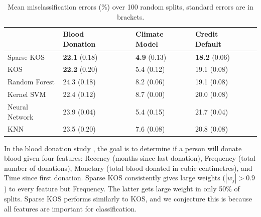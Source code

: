\documentclass[twoside, onecolumn]{article}
\begin{document}
\begin{table}[!t]
\begin{center}
    \begin{tabular}{|p{2.5cm} | p{1.7cm} |p{1.5cm} |p{1.7cm} | }
    \hline
    {}& {Blood $\quad$ Donation} & Climate Model & Credit$\quad$  Default\\ \hline
    Sparse KOS & \textbf{22.1} (0.18) & \textbf{4.9} (0.13) & \textbf{18.2} (0.06) \\ \hline
    KOS &\textbf{22.2} (0.20) & 5.4 (0.12) & 19.1 (0.08)\\ \hline
    Random Forest & 24.3 (0.18)& 8.2 (0.06) & 19.1 (0.08)\\ \hline
    Kernel SVM& 22.4 (0.12)&8.7 (0.00)& 20.0 (0.08)\\ \hline
    Neural Network& 23.9 (0.04) &5.4 (0.15)& 21.7 (0.04)\\ \hline
    KNN & 23.5 (0.20) & 7.6 (0.08)& 20.8 (0.08)\\ \hline
    \end{tabular}
     \caption{Mean misclassification errors (\%) over 100 random splits, standard errors are in brackets.} 
      \label{tab:Errors}
\end{center}
\end{table}

In the blood donation study \cite{yeh2009knowledge}, the goal is to determine if a person will donate blood given four features: Recency (months since last donation), Frequency (total number of donations), 
Monetary (total blood donated in cubic centimetres), and Time since first donation. Sparse KOS consistently gives large weights ($|w_j|>0.9$) to every feature but Frequency. The latter gets large weight in only 50\% of splits. %
Sparse KOS performs similarly to KOS, and we conjecture this is because all features are important for classification.


\end{document}
